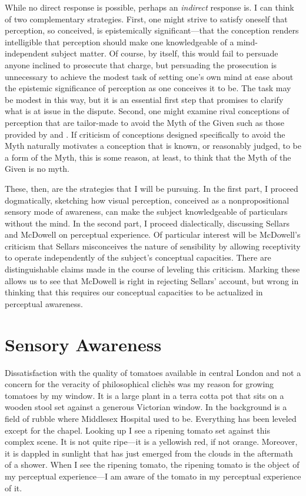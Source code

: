 \documentclass[12pt]{article}
\begin{document}
While no direct response is possible, perhaps an \emph{indirect} response is. I can think of two complementary strategies. First, one might strive to satisfy oneself that perception, so conceived, is epistemically significant---that the conception renders intelligible that perception should make one knowledgeable of a mind-independent subject matter. Of course, by itself, this would fail to persuade anyone inclined to prosecute that charge, but persuading the prosecution is unnecessary to achieve the modest task of setting one's own mind at ease about the epistemic significance of perception as one conceives it to be. The task may be modest in this way, but it is an essential first step that promises to clarify what is at issue in the dispute. Second, one might examine rival conceptions of perception that are tailor-made to avoid the Myth of the Given such as those provided by \citet{Sellars:1956xp,Sellars:1967uq} and \citet{McDowell:1996uq,McDowell:1998vn,McDowell:2008fk}. If criticism of conceptions designed specifically to avoid the Myth naturally motivates a conception that is known, or reasonably judged, to be a form of the Myth, this is some reason, at least, to think that the Myth of the Given is no myth. 

These, then, are the strategies that I will be pursuing. In the first part, I proceed dogmatically, sketching how visual perception, conceived as a nonpropositional sensory mode of awareness, can make the subject knowledgeable of particulars without the mind. In the second part, I proceed dialectically, discussing Sellars and McDowell on perceptual experience. Of particular interest will be McDowell's criticism that Sellars misconceives the nature of sensibility by allowing receptivity to operate independently of the subject's conceptual capacities. There are distinguishable claims made in the course of leveling this criticism. Marking these allows us to see that McDowell is right in rejecting Sellars' account, but wrong in thinking that this requires our conceptual capacities to be actualized in perceptual awareness.


\section{Sensory Awareness} %
\label{sec:sensory_awareness}

Dissatisfaction with the quality of tomatoes available in central London and not a concern for the veracity of philosophical clichès was my reason for growing tomatoes by my window. It is a large plant in a terra cotta pot that sits on a wooden stool set against a generous Victorian window. In the background is a field of rubble where Middlesex Hospital used to be. Everything has been leveled except for the chapel. Looking up I see a ripening tomato set against this complex scene. It is not quite ripe---it is a yellowish red, if not orange. Moreover, it is dappled in sunlight that has just emerged from the clouds in the aftermath of a shower. When I see the ripening tomato, the ripening tomato is the object of my perceptual experience---I am aware of the tomato in my perceptual experience of it. 
\end{document}
